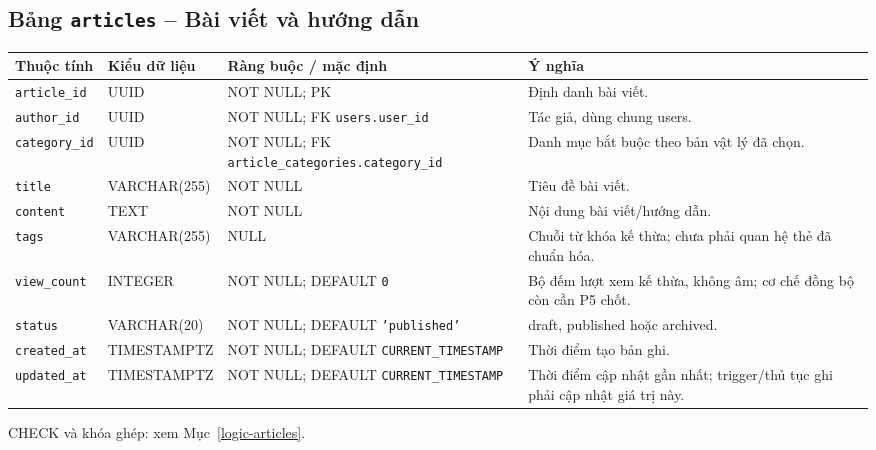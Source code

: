 \subsection{Bảng \texttt{articles} -- Bài viết và hướng dẫn}
\label{dictionary-articles}
\begingroup
\footnotesize
\setlength{\tabcolsep}{3pt}
\begin{longtable}{>{\raggedright\arraybackslash}p{3.1cm}>{\raggedright\arraybackslash}p{2.5cm}>{\raggedright\arraybackslash}p{3.7cm}>{\raggedright\arraybackslash}p{4.3cm}}
\toprule
Thuộc tính & Kiểu dữ liệu & Ràng buộc / mặc định & Ý nghĩa \\
\midrule
\endhead
\texttt{article\_\allowbreak{}id} & UUID & NOT NULL; PK & Định danh bài viết. \\
\texttt{author\_\allowbreak{}id} & UUID & NOT NULL; FK \texttt{users.user\_\allowbreak{}id} & Tác giả, dùng chung users. \\
\texttt{category\_\allowbreak{}id} & UUID & NOT NULL; FK \texttt{article\_\allowbreak{}categories.category\_\allowbreak{}id} & Danh mục bắt buộc theo bản vật lý đã chọn. \\
\texttt{title} & VARCHAR(255) & NOT NULL & Tiêu đề bài viết. \\
\texttt{content} & TEXT & NOT NULL & Nội dung bài viết/hướng dẫn. \\
\texttt{tags} & VARCHAR(255) & NULL & Chuỗi từ khóa kế thừa; chưa phải quan hệ thẻ đã chuẩn hóa. \\
\texttt{view\_\allowbreak{}count} & INTEGER & NOT NULL; DEFAULT \texttt{0} & Bộ đếm lượt xem kế thừa, không âm; cơ chế đồng bộ còn cần P5 chốt. \\
\texttt{status} & VARCHAR(20) & NOT NULL; DEFAULT \texttt{'published'} & draft, published hoặc archived. \\
\texttt{created\_\allowbreak{}at} & TIMESTAMPTZ & NOT NULL; DEFAULT \texttt{CURRENT\_\allowbreak{}TIMESTAMP} & Thời điểm tạo bản ghi. \\
\texttt{updated\_\allowbreak{}at} & TIMESTAMPTZ & NOT NULL; DEFAULT \texttt{CURRENT\_\allowbreak{}TIMESTAMP} & Thời điểm cập nhật gần nhất; trigger/thủ tục ghi phải cập nhật giá trị này. \\
\bottomrule
\end{longtable}
\endgroup
CHECK và khóa ghép: xem Mục~\ref{logic-articles}.

